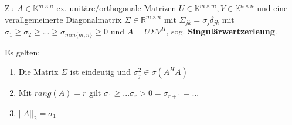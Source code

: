 \begin{theorem}[Singulärwertzerlegung]
	Zu $A \in \mathbb{K}^{m\times n}$ ex. unitäre/orthogonale Matrizen $U \in \mathbb{K}^{m\times m}, V \in \mathbb{K}^{n\times n}$ und eine verallgemeinerte Diagonalmatrix $\Sigma \in \mathbb{R}^{m\times n}$ mit $\Sigma_{jk} = \sigma_j \delta_{jk}$ mit $\sigma_1 \geq \sigma_2 \geq ... \geq \sigma_{min\{m,n\}} \geq 0$ und $A = U\Sigma V^H$, sog. \textbf{Singulärwertzerleung}.
	
	Es gelten:
	\begin{enumerate}
		\item Die Matrix $\Sigma$ ist eindeutig und $\sigma_j^2 \in \sigma(A^HA)$
		\item Mit $rang(A) = r$ gilt $\sigma_1 \geq ... \sigma_r > 0 = \sigma_{r+1} = ...$
		\item $||A||_2 = \sigma_1$
	\end{enumerate}
\end{theorem}

